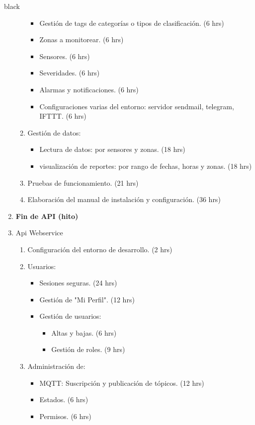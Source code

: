 \documentclass[11pt]{charter}
\begin{document}
\begin{consigna}{black}
\begin{enumerate}
\begin{enumerate}
\begin{itemize}
				\item Gestión de tags de categorías o tipos de clasificación. (6 hrs) 
				\item Zonas a monitorear. (6 hrs) 
				\item Sensores. (6 hrs)
 				\item Severidades. (6 hrs)
				\item Alarmas y notificaciones. (6 hrs) 
				\item Configuraciones varias del entorno: servidor sendmail, telegram, IFTTT. (6 hrs)
			\end{itemize}
		\item Gestión de datos:
			\begin{itemize}
				\item Lectura de datos: por sensores y zonas. (18 hrs) 
				\item visualización de reportes: por rango de fechas, horas y zonas. (18 hrs) 
			\end{itemize}
		\item Pruebas de funcionamiento. (21 hrs) 
		\item Elaboración del manual de instalación y configuración. (36 hrs)  	
	\end{enumerate}
\item \textbf{Fin de API (hito)} 	
\item Api Webservice
	\begin{enumerate}
		\item Configuración del entorno de desarrollo. (2 hrs)
		\item Usuarios:
			\begin{itemize}
				\item Sesiones seguras. (24 hrs)
				\item Gestión de "Mi Perfil". (12 hrs)
				\item Gestión de usuarios:
				\begin{itemize}
					\item Altas y bajas. (6 hrs) 
					\item Gestión de roles. (9 hrs)
				\end{itemize}
			\end{itemize}
		\item Administración de:
			\begin{itemize}
				\item MQTT: Suscripción y publicación de tópicos. (12 hrs) 
				\item Estados. (6 hrs)
				\item Permisos. (6 hrs)  

\end{itemize}
\end{enumerate}
\end{enumerate}
\end{consigna}
\end{document}
